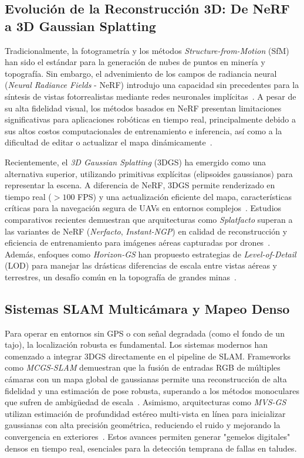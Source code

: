\documentclass[12pt,a4paper]{article}
\begin{document}
	\subsection{Evolución de la Reconstrucción 3D: De NeRF a 3D Gaussian Splatting}
	Tradicionalmente, la fotogrametría y los métodos \textit{Structure-from-Motion} (SfM) han sido el estándar para la generación de nubes de puntos en minería y topografía. Sin embargo, el advenimiento de los campos de radiancia neural (\textit{Neural Radiance Fields} - NeRF) introdujo una capacidad sin precedentes para la síntesis de vistas fotorrealistas mediante redes neuronales implícitas~\cite{mildenhall2021nerf, atik2025comparative}. A pesar de su alta fidelidad visual, los métodos basados en NeRF presentan limitaciones significativas para aplicaciones robóticas en tiempo real, principalmente debido a sus altos costos computacionales de entrenamiento e inferencia, así como a la dificultad de editar o actualizar el mapa dinámicamente~\cite{liu2025survey, atik2025comparative}.
	
	Recientemente, el \textit{3D Gaussian Splatting} (3DGS) ha emergido como una alternativa superior, utilizando primitivas explícitas (elipsoides gaussianos) para representar la escena. A diferencia de NeRF, 3DGS permite renderizado en tiempo real ($>100$ FPS) y una actualización eficiente del mapa, características críticas para la navegación segura de UAVs en entornos complejos~\cite{kerbl20233dgs, zhang2025autonomous}. Estudios comparativos recientes demuestran que arquitecturas como \textit{Splatfacto} superan a las variantes de NeRF (\textit{Nerfacto}, \textit{Instant-NGP}) en calidad de reconstrucción y eficiencia de entrenamiento para imágenes aéreas capturadas por drones~\cite{atik2025comparative}. Además, enfoques como \textit{Horizon-GS} han propuesto estrategias de \textit{Level-of-Detail} (LOD) para manejar las drásticas diferencias de escala entre vistas aéreas y terrestres, un desafío común en la topografía de grandes minas~\cite{horizongs2025}.
	
	\subsection{Sistemas SLAM Multicámara y Mapeo Denso}
	Para operar en entornos sin GPS o con señal degradada (como el fondo de un tajo), la localización robusta es fundamental. Los sistemas modernos han comenzado a integrar 3DGS directamente en el pipeline de SLAM. Frameworks como \textit{MCGS-SLAM} demuestran que la fusión de entradas RGB de múltiples cámaras con un mapa global de gaussianas permite una reconstrucción de alta fidelidad y una estimación de pose robusta, superando a los métodos monoculares que sufren de ambigüedad de escala~\cite{cao2024mcgs}. Asimismo, arquitecturas como \textit{MVS-GS} utilizan estimación de profundidad estéreo multi-vista en línea para inicializar gaussianas con alta precisión geométrica, reduciendo el ruido y mejorando la convergencia en exteriores~\cite{lee2025mvsgs}. Estos avances permiten generar "gemelos digitales" densos en tiempo real, esenciales para la detección temprana de fallas en taludes.
	
\end{document}
